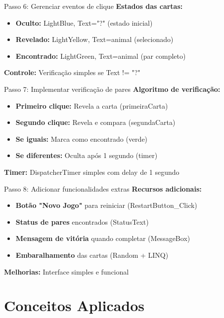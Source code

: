 \documentclass[aspectratio=169]{beamer}
\begin{document}
\begin{frame}{Passo 6: Gerenciar eventos de clique}
\textbf{Estados das cartas:}
\begin{itemize}
    \item \textbf{Oculto:} LightBlue, Text="?" (estado inicial)
    \item \textbf{Revelado:} LightYellow, Text=animal (selecionado)
    \item \textbf{Encontrado:} LightGreen, Text=animal (par completo)
\end{itemize}

\textbf{Controle:} Verificação simples se Text != "?"
\end{frame}

\begin{frame}{Passo 7: Implementar verificação de pares}
\textbf{Algoritmo de verificação:}
\begin{itemize}
    \item \textbf{Primeiro clique:} Revela a carta (primeiraCarta)
    \item \textbf{Segundo clique:} Revela e compara (segundaCarta)
    \item \textbf{Se iguais:} Marca como encontrado (verde)
    \item \textbf{Se diferentes:} Oculta após 1 segundo (timer)
\end{itemize}

\textbf{Timer:} DispatcherTimer simples com delay de 1 segundo
\end{frame}

\begin{frame}{Passo 8: Adicionar funcionalidades extras}
\textbf{Recursos adicionais:}
\begin{itemize}
    \item \textbf{Botão "Novo Jogo"} para reiniciar (RestartButton\_Click)
    \item \textbf{Status de pares} encontrados (StatusText)
    \item \textbf{Mensagem de vitória} quando completar (MessageBox)
    \item \textbf{Embaralhamento} das cartas (Random + LINQ)
\end{itemize}

\textbf{Melhorias:} Interface simples e funcional
\end{frame}

\section{Conceitos Aplicados}
\end{document}
